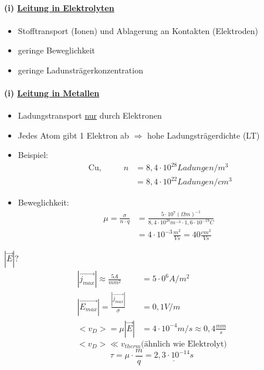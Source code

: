 \documentclass[11pt]{article}
\begin{document}
	\subsection{}
	\paragraph{(i) \underline{Leitung in Elektrolyten}}
	\begin{itemize}
		\item Stofftransport (Ionen) und Ablagerung an Kontakten (Elektroden)
		\item geringe Beweglichkeit
		\item geringe Ladunsträgerkonzentration
	\end{itemize}
	\paragraph{(i) \underline{Leitung in Metallen}}
	\begin{itemize}
		\item Ladungstransport \underline{nur} durch Elektronen
		\item Jedes Atom gibt 1 Elektron ab $ \Rightarrow $ hohe Ladungsträgerdichte (LT)
		\item Beispiel: \begin{align*}
		\text{ Cu, }\hspace{1cm} n &= 8,4 \cdot 10^{28} Ladungen/m^3 \\
		&=8,4 \cdot 10^{22} Ladungen/cm^3
		\end{align*} 
		\item Beweglichkeit: \begin{align*}
		\mu = \frac{\sigma}{n \cdot q} &= \frac{5\cdot10^7(\Omega m)^{-1}}{8,4\cdot 10^{28}m^{-3}\cdot 1,6\cdot 10^{-19}C } \\
		&= 4\cdot 10^{-3} \frac{m^2}{Vs} = 40 \frac{cm^2}{Vs}
		\end{align*}
	\end{itemize}
	\break
	\noindent $ |\vec{E}| ? $ \\
	\begin{align*}
	|\vec{j_{max}}| \approx \frac{5A}{mm^2} &=5\cdot 0^6 A/m^2 \\
	|\vec{E_{max}}| = \frac{|\vec{j_{max}}|}{\sigma} &= 0,1 V/m \\
	<v_D> = \mu |\vec{E}| &= 4\cdot 10^{-4} m/s \approx 0,4 \frac{mm}{s}
	\end{align*}
	$$<v_D> \ll v_ {therm} \text{(ähnlich wie Elektrolyt)}$$
	$$ \tau = \mu \cdot \frac{m}{q} = \underline{2,3 \cdot 10^{-14}s}$$
\end{document}
